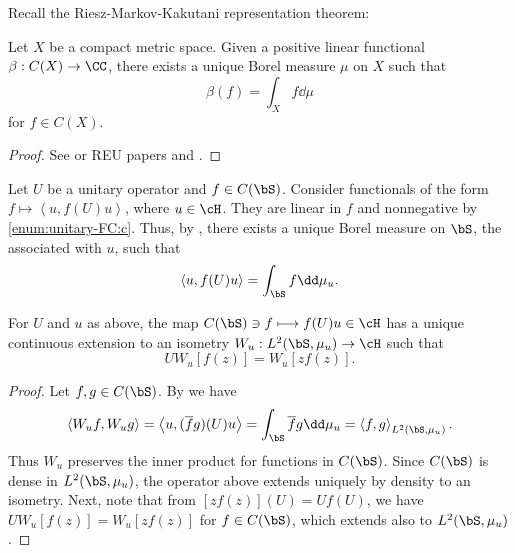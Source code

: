 \documentclass[oneside,reqno,letterpaper]{amsart}
\begin{document}


Recall the Riesz-Markov-Kakutani representation theorem: 
\begin{theorem}
\label{thm:riesz-representation-measure}
  Let \(X\) be a compact metric space. Given a positive linear functional \(\beta: C(X) \to \CC\), there exists a unique Borel measure \(\mu\) on \(X\) such that 
  \[
    \beta(f) = \int_{X} f \dd\mu
  \] 
  for \(f \in C(X)\). 
\end{theorem}
\begin{proof}
  See \cite[p.~310]{borthwick2020spectral} or REU papers \cite{espejo2023riesz} and \cite{stump2023lebesgue}. 
\end{proof}




Let \(U\) be a unitary operator and \(f \in C(\bS)\). 
Consider functionals of the form \(f \mapsto \left< u, f(U) u \right>\), where \(u \in \cH\). 
They are linear in \(f\) and nonnegative by  \ref{enum:unitary-FC:c}. 
Thus, by , there exists a unique Borel measure on \(\bS\), the  associated with \(u\), such that 
\[
  \left< u, f(U) u \right> = \int_{\bS} f \dd\mu_u . 
\] 

\begin{lemma}\label{lem:isometric-extension}
  For \(U\) and \(u\) as above, the map \(C(\bS) \ni f \longmapsto f(U) u \in \cH \)
  has a unique continuous extension to an isometry \(W_u: L^2(\bS, \mu_u) \to \cH\) such that 
  \[
    U W_u [f(z)] = W_u [z f(z)] . 
  \] 
\end{lemma}
\begin{proof}
  Let \(f, g \in C(\bS)\). 
  By  we have 
  \begin{align*}
    \left< W_u f, W_u g \right> 
    = \left< u, (\overline{f}g)(U) u \right>
    = \int_{\bS} \overline{f} g \dd\mu_u = \left< f, g \right>_{L^2(\bS, \mu_u)} . 
  \end{align*}
  Thus \(W_u\) preserves the inner product for functions in \(C(\bS)\). Since \(C(\bS)\) is dense in \(L^2(\bS, \mu_u)\), the operator above extends uniquely by density to an isometry. 
  Next, note that from \([zf(z)](U) = U f(U)\), we have \(UW_u[f(z)] = W_u[z f(z)]\) for \(f \in C(\bS)\), which extends also to \(L^2(\bS, \mu_u)\).  
\end{proof}
\end{document}
